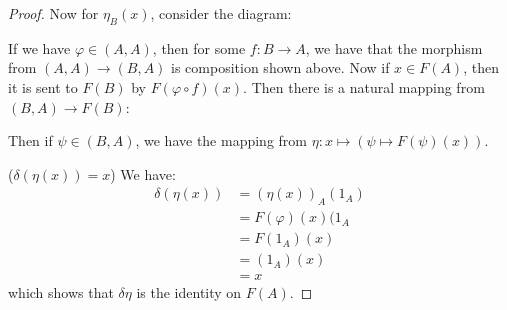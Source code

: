 \documentclass{article}
\begin{document}
\begin{proof}
        Now for $\eta_{B}(x)$, consider the diagram:
            \begin{center}
            \end{center}
        If we have $\varphi \in (A, A)$, then for some $f : B \rightarrow A$, we have that the morphism from $(A, A) \rightarrow (B, A)$ is composition shown above. Now if $x \in F(A)$, then it is sent to $F(B)$ by $F(\varphi \circ f)(x)$. Then there is a natural mapping from $(B, A) \rightarrow F(B)$:
            \begin{center}
            \end{center}
        Then if $\psi \in (B, A)$, we have the mapping from $\eta : x \mapsto (\psi \mapsto F(\psi)(x))$. 

        ($\delta(\eta(x)) = x$) We have:
            \begin{align*}
                \delta(\eta(x)) &= (\eta(x))_{A}(1_{A}) \\
                                &= F(\varphi)(x)(1_{A}  \\
                                &= F(1_{A})(x)          \\
                                &= (1_{A})(x)           \\
                                &= x                      
            \end{align*}
        which shows that $\delta\eta$ is the identity on $F(A)$.


\end{proof}
\end{document}
